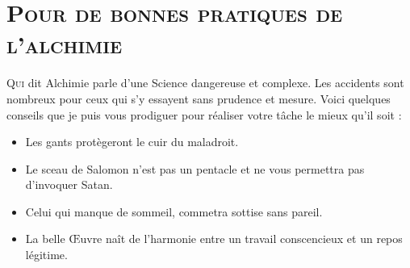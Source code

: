 \section{\textsc{Pour de bonnes pratiques de l'alchimie}}

\lettrine{Q}{ui} dit Alchimie parle d'une Science dangereuse et complexe. Les
accidents sont nombreux pour ceux qui s'y essayent sans prudence et mesure.
Voici quelques conseils que je puis vous prodiguer pour réaliser votre tâche le
mieux qu'il soit :

\begin{itemize}
    \item Les gants protègeront le cuir du maladroit.
    \item Le sceau de Salomon n'est pas un pentacle et ne vous permettra pas
        d'invoquer Satan.
    \item Celui qui manque de sommeil, commetra sottise sans pareil.
    \item La belle Œuvre naît de l'harmonie entre un travail conscencieux et
        un repos légitime.
\end{itemize}
